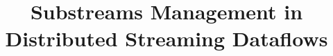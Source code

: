 \documentclass{vldb}
\begin{document}
\title {Substreams Management in Distributed Streaming Dataflows}



\maketitle
\end{document}
